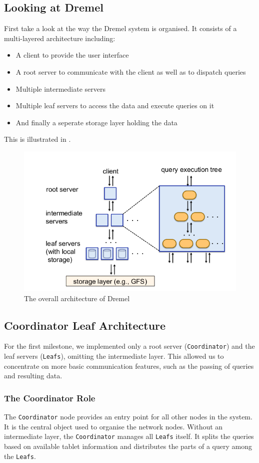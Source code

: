   \subsection{Looking at Dremel}
    First take a look at the way the Dremel \cite{melnik2010dremel} system is
    organised.
    It consists of a multi-layered architecture including:
    \begin{itemize}
      \item A client to provide the user interface
      \item A root server to communicate with the client as well as to dispatch
        queries
      \item Multiple intermediate servers
      \item Multiple leaf servers to access the data and execute queries on it
      \item And finally a seperate storage layer holding the data
    \end{itemize}
    This is illustrated in .
    \begin{figure}[ht]
      \centering
      \includegraphics[width=.7\textwidth]{images/net-arch}
      \caption{The overall architecture of Dremel\cite{melnik2010dremel}}
      \label{fig:netarch}
    \end{figure}


  \subsection{Coordinator Leaf Architecture}
    For the first milestone, we implemented only a root server
    (\texttt{Coordinator}) and the leaf servers (\texttt{Leafs}),
    omitting the intermediate layer.
    This allowed us to concentrate on more basic communication features,
    such as the passing of queries and resulting data.
    \subsubsection{The Coordinator Role}
      The \texttt{Coordinator} node provides an entry point for all other nodes
      in the system.
      It is the central object used to organise the network nodes.
      Without an intermediate layer, the \texttt{Coordinator} manages all
      \texttt{Leafs} itself. It splits the queries based on available tablet
      information and distributes the parts of a query among the \texttt{Leafs}.
    
